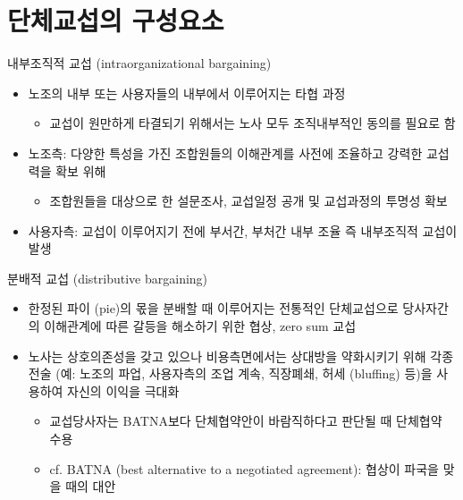 \documentclass[aspectratio=169,xcolor=dvipsnames,handout]{beamer}
\begin{document}
\section{단체교섭의 구성요소}

\begin{frame}{내부조직적 교섭 (intraorganizational bargaining)}
    \begin{itemize}[<+->]
        \item 노조의 내부 또는 사용자들의 내부에서 이루어지는 타협 과정
        \begin{itemize}[<+->]
            \item 교섭이 원만하게 타결되기 위해서는 노사 모두 조직내부적인 동의를 필요로 함
        \end{itemize}
    \item 노조측: 다양한 특성을 가진 조합원들의 이해관계를 사전에 조율하고 강력한 교섭력을 확보 위해
        \begin{itemize}[<+->]
            \item 조합원들을 대상으로 한 설문조사, 교섭일정 공개 및 교섭과정의 투명성 확보
        \end{itemize}
    \item 사용자측: 교섭이 이루어지기 전에 부서간, 부처간 내부 조율 즉 내부조직적 교섭이 발생
    \end{itemize}
\end{frame}

\begin{frame}{분배적 교섭 (distributive bargaining)}
    \begin{itemize}[<+->]
        \item 한정된 파이 (pie)의 몫을 분배할 때 이루어지는 전통적인 단체교섭으로 당사자간의 이해관계에 따른 갈등을 해소하기 위한 협상, zero sum 교섭
        \item 노사는 상호의존성을 갖고 있으나 비용측면에서는 상대방을 약화시키기 위해 각종 전술 (예: 노조의 파업, 사용자측의 조업 계속, 직장폐쇄, 허세 (bluffing) 등)을 사용하여 자신의 이익을 극대화
        \begin{itemize}[<+->]
            \item 교섭당사자는 BATNA보다 단체협약안이 바람직하다고 판단될 때 단체협약 수용
            \item cf. BATNA (best alternative to a negotiated agreement): 협상이 파국을 맞을 때의 대안
        \end{itemize}
    \end{itemize}
\end{frame}
\end{document}
